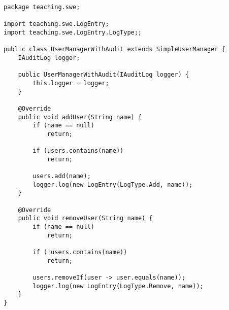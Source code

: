 \begin{lstlisting}[style=javastyle, caption={UserManagerWithAudit}]
package teaching.swe;

import teaching.swe.LogEntry;
import teaching.swe.LogEntry.LogType;;

public class UserManagerWithAudit extends SimpleUserManager {
    IAuditLog logger;

    public UserManagerWithAudit(IAuditLog logger) {
        this.logger = logger;
    }

    @Override
    public void addUser(String name) {
        if (name == null)
            return;

        if (users.contains(name))
            return;

        users.add(name);
        logger.log(new LogEntry(LogType.Add, name));
    }

    @Override
    public void removeUser(String name) {
        if (name == null)
            return;

        if (!users.contains(name))
            return;

        users.removeIf(user -> user.equals(name));
        logger.log(new LogEntry(LogType.Remove, name));
    }
}

\end{lstlisting}

